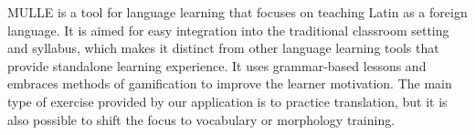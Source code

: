MULLE is a tool for language learning that focuses on teaching Latin as a foreign language. It is aimed for easy integration into the traditional classroom setting and syllabus, which makes it distinct from other language learning tools that provide standalone learning experience. It uses grammar-based lessons and embraces methods of gamification to improve the learner motivation. The main type of exercise provided by our application is to practice translation, but it is also possible to shift the focus to vocabulary or morphology training.
